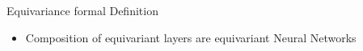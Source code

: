 \documentclass[aspectratio=64,8pt]{beamer}
\begin{document}
\begin{frame}{Equivariance formal Definition}
\begin{itemize}
\begin{tcolorbox}[title=\textbf{What's the role of equivariance in Physics?},colback=blue!5!white]
\begin{columns}
            \begin{column}{0.72\linewidth}
              {\small 
              \begin{equation}\nonumber
               P_{ij}\mathcal{A}(\dots\otimes \psi_{\alpha}(\vec{x}_i)\otimes\dots\otimes\psi_{\beta}(\vec{x}_j) \otimes \dots) = - \mathcal{A}(\dots\otimes\psi_{\alpha}(\vec{x}_i)\otimes\dots\otimes\psi_{\beta}(\vec{x}_j)\otimes\dots)
              \end{equation}
              }
            \end{column}
          \end{columns}
          \begin{columns}

            \begin{column}{1\linewidth}
              {\small 
              \vspace{5pt}
              \begin{equation}\nonumber
                  \pi^a(x) \longmapsto U_{\boldsymbol{\theta}}(\pi^a(x))=D^{ba}(U_{\boldsymbol{\theta}})\,\pi^a(x),
                  \qquad U=\exp\bigl(i\sum \boldsymbol{\theta} \cdot \boldsymbol{\tau}/2\bigr)
                \end{equation}
              }
            \end{column}
          \end{columns}

      \end{tcolorbox}
      \item     Composition of equivariant layers are equivariant Neural Networks

    \end{itemize}
\end{frame}
\end{document}
